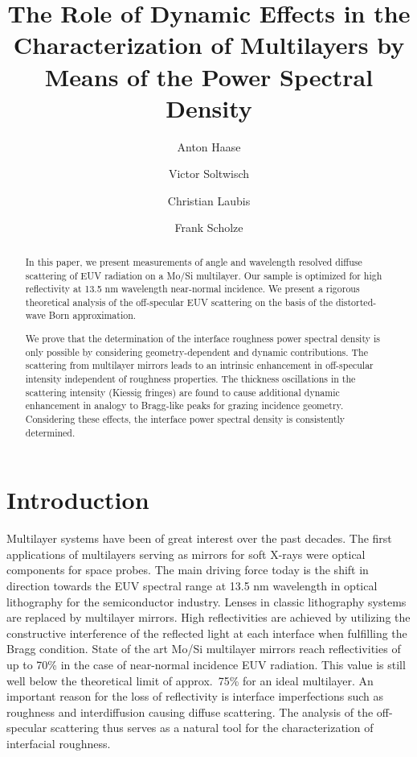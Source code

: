 \documentclass[twocolumn,osajnl,showpacs,superscriptaddress,11pt]{revtex4-1}
\begin{document}
\title{The Role of Dynamic Effects in the Characterization of Multilayers by Means of the Power Spectral Density}

\author{Anton Haase} 
\author{Victor Soltwisch} 
\author{Christian Laubis} 
\author{Frank Scholze} 
\begin{abstract}
In this paper, we present measurements of angle and wavelength resolved diffuse scattering of EUV radiation on a Mo/Si multilayer. Our sample is optimized for high reflectivity at 13.5 nm wavelength near-normal incidence. We present a rigorous theoretical analysis of the off-specular EUV scattering on the basis of the distorted-wave Born approximation.

We prove that the determination of the interface roughness power spectral density is only possible by considering geometry-dependent and dynamic contributions. The scattering from multilayer mirrors leads to an intrinsic enhancement in off-specular intensity independent of roughness properties. The thickness oscillations in the scattering intensity (Kiessig fringes) are found to cause additional dynamic enhancement in analogy to Bragg-like peaks for grazing incidence geometry. Considering these effects, the  interface power spectral density is consistently determined.
\end{abstract}


\maketitle 

\section{Introduction} Multilayer systems have been of great interest over the past decades. The first applications of multilayers serving as mirrors for soft X-rays were optical components for space probes. The main driving force today is the shift in direction towards the EUV spectral range at 13.5 nm wavelength in optical lithography for the semiconductor industry. Lenses in classic lithography systems are replaced by multilayer mirrors. High  reflectivities are achieved by utilizing the constructive interference of the reflected light at each interface when fulfilling the Bragg condition. State of the art Mo/Si multilayer mirrors reach reflectivities of up to 70\% \cite{braun2002mo, Feigl2006703} in the case of near-normal incidence EUV radiation. This value is still well below the theoretical limit of approx.~75\% for an ideal multilayer. An important reason for the loss of reflectivity is interface imperfections such as roughness and interdiffusion causing diffuse scattering. The analysis of the off-
specular scattering 
thus serves as a 
natural tool for the characterization of interfacial roughness. 
\end{document}
